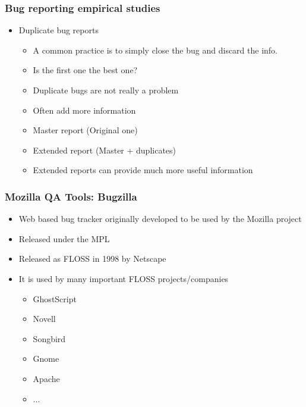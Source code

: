 \documentclass{beamer}
\begin{document}
\begin{frame}
 \frametitle{Bug reporting empirical studies}
 \begin{itemize}
    \item Duplicate bug reports
       \begin{itemize}
       \item A common practice is to simply close the bug and discard the info.
       \item Is the first one the best one?
       \item Duplicate bugs are not really a problem
       \item Often add more information
       \item Master report (Original one)
       \item Extended report (Master + duplicates)
       \item Extended reports can provide much more useful information
       \end{itemize}
 \end{itemize}
\end{frame}


\begin{frame}
 \frametitle{Mozilla QA Tools: Bugzilla}
 \begin{itemize}
 \item Web based bug tracker originally developed to be used by the Mozilla project
 \item Released under the MPL
 \item Released as FLOSS in 1998 by Netscape
 \item It is used by many important FLOSS projects/companies
    \begin{itemize}
    \item GhostScript
    \item Novell
    \item Songbird
    \item Gnome
    \item Apache
    \item ...
    \end{itemize}
 \end{itemize}
\end{frame}

\end{document}
